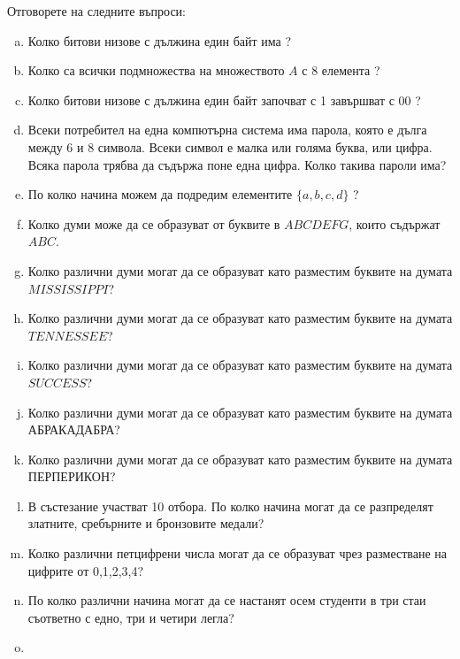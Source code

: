 \begin{problem}
  Отговорете на следните въпроси:
  \begin{enumerate}[a)]
  \item
    Колко битови низове с дължина един байт има ?
  \item
    Колко са всички подмножества на множеството $A$ с $8$ елемента ?
  \item 
    Колко битови низове с дължина един байт започват с 1 завършват с 00 ?
  \item
    Всеки потребител на една компютърна система има парола, която е дълга между 6 и 8 символа.
    Всеки символ е малка или голяма буква, или цифра.
    Всяка парола трябва да съдържа поне една цифра.
    Колко такива пароли има?
  \item
    По колко начина можем да подредим елементите $\{a,b,c,d\}$ ?
  \item 
    Колко думи може да се образуват от буквите в $ABCDEFG$, които съдържат $ABC$.
  \item
    Колко различни думи могат да се образуват като разместим буквите на думата $MISSISSIPPI$?
  \item
    Колко различни думи могат да се образуват като разместим буквите на думата $TENNESSEE$?
  \item
    Колко различни думи могат да се образуват като разместим буквите на думата $SUCCESS$?
  \item
    Колко различни думи могат да се образуват като разместим буквите на думата АБРАКАДАБРА?
  \item
    Колко различни думи могат да се образуват като разместим буквите на думата ПЕРПЕРИКОН?
  \item
    В състезание участват 10 отбора. 
    По колко начина могат да се разпределят златните, сребърните и бронзовите медали?
  \item
    Колко различни петцифрени числа могат да се образуват чрез разместване на цифрите от 0,1,2,3,4?
  \item
    По колко различни начина могат да се настанят осем студенти в три стаи съответно с едно, три и четири легла?
  \item

\end{enumerate}
\end{problem}
